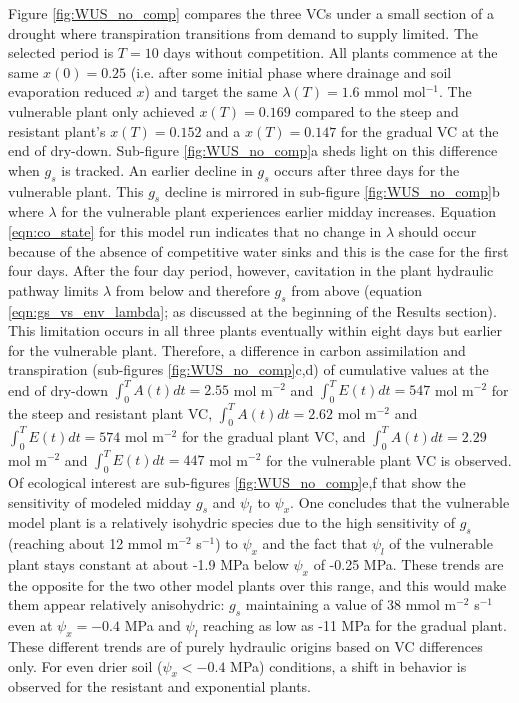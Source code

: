 \documentclass[utf8]{frontiersSCNS} %
\begin{document}
Figure \ref{fig:WUS_no_comp} compares the three VCs under a small section of a drought where transpiration transitions from demand to supply limited. The selected period is $T=10$ days without competition. All plants commence at the same $x(0)=0.25$ (i.e. after some initial phase where drainage and soil evaporation reduced $x$) and target the same $\lambda(T)=1.6$ mmol mol$^{-1}$. The vulnerable plant only achieved $x(T)=0.169$ compared to the steep and resistant plant's $x(T)=0.152$ and a $x(T)=0.147$ for the gradual VC at the end of dry-down. Sub-figure \ref{fig:WUS_no_comp}a sheds light on this difference when $g_s$ is tracked. An earlier decline in $g_s$ occurs after three days for the vulnerable plant. This $g_s$ decline is mirrored in sub-figure \ref{fig:WUS_no_comp}b where $\lambda$ for the vulnerable plant experiences earlier midday increases. Equation \ref{eqn:co_state} for this model run indicates that no change in $\lambda$ should occur because of the absence of competitive water sinks and this is the case for the first four days. After the four day period, however, cavitation in the plant hydraulic pathway limits $\lambda$ from below and therefore $g_s$ from above (equation \ref{eqn:gs_vs_env_lambda}; as discussed at the beginning of the Results section). This limitation occurs in all three plants eventually within eight days but earlier for the vulnerable plant. Therefore, a difference in carbon assimilation and transpiration (sub-figures \ref{fig:WUS_no_comp}c,d) of cumulative values at the end of dry-down $\int_0^TA(t)dt= 2.55$ mol m$^{-2}$ and $\int_0^TE(t)dt= 547$ mol m$^{-2}$ for the steep and resistant plant VC, $\int_0^TA(t)dt= 2.62$ mol m$^{-2}$ and $\int_0^TE(t)dt= 574$ mol m$^{-2}$ for the gradual plant VC, and $\int_0^TA(t)dt= 2.29$ mol m$^{-2}$ and $\int_0^TE(t)dt= 447$ mol m$^{-2}$ for the vulnerable plant VC is observed. Of ecological interest are sub-figures \ref{fig:WUS_no_comp}e,f that show the sensitivity of modeled midday $g_s$ and $\psi_l$ to $\psi_x$. One concludes that the vulnerable model plant is a relatively isohydric species due to the high sensitivity of $g_s$ (reaching about 12 mmol m$^{-2}$ s$^{-1}$) to $\psi_x$ and the fact that $\psi_l$ of the vulnerable plant stays constant at about -1.9 MPa below $\psi_x$ of -0.25 MPa. These trends are the opposite for the two other model plants over this range, and this would make them appear relatively anisohydric: $g_s$ maintaining a value of 38 mmol m$^{-2}$ s$^{-1}$ even at $\psi_x = -0.4$ MPa and $\psi_l$ reaching as low as -11 MPa for the gradual plant. These different trends are of purely hydraulic origins based on VC differences only. For even drier soil ($\psi_x < -0.4$ MPa) conditions, a shift in behavior is observed for the resistant and exponential plants. 
\end{document}
